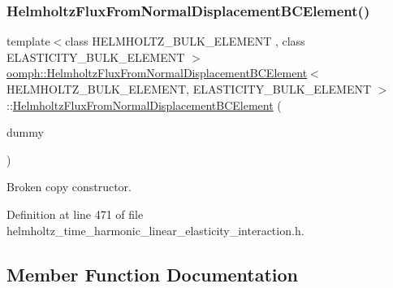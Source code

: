 \subsubsection{\texorpdfstring{Helmholtz\+Flux\+From\+Normal\+Displacement\+B\+C\+Element()}{HelmholtzFluxFromNormalDisplacementBCElement()}\hspace{0.1cm}{\footnotesize\ttfamily [2/2]}}
{\footnotesize\ttfamily template$<$class H\+E\+L\+M\+H\+O\+L\+T\+Z\+\_\+\+B\+U\+L\+K\+\_\+\+E\+L\+E\+M\+E\+NT , class E\+L\+A\+S\+T\+I\+C\+I\+T\+Y\+\_\+\+B\+U\+L\+K\+\_\+\+E\+L\+E\+M\+E\+NT $>$ \\
\hyperlink{classoomph_1_1HelmholtzFluxFromNormalDisplacementBCElement}{oomph\+::\+Helmholtz\+Flux\+From\+Normal\+Displacement\+B\+C\+Element}$<$ H\+E\+L\+M\+H\+O\+L\+T\+Z\+\_\+\+B\+U\+L\+K\+\_\+\+E\+L\+E\+M\+E\+NT, E\+L\+A\+S\+T\+I\+C\+I\+T\+Y\+\_\+\+B\+U\+L\+K\+\_\+\+E\+L\+E\+M\+E\+NT $>$\+::\hyperlink{classoomph_1_1HelmholtzFluxFromNormalDisplacementBCElement}{Helmholtz\+Flux\+From\+Normal\+Displacement\+B\+C\+Element} (\begin{DoxyParamCaption}\item[{const \hyperlink{classoomph_1_1HelmholtzFluxFromNormalDisplacementBCElement}{Helmholtz\+Flux\+From\+Normal\+Displacement\+B\+C\+Element}$<$ H\+E\+L\+M\+H\+O\+L\+T\+Z\+\_\+\+B\+U\+L\+K\+\_\+\+E\+L\+E\+M\+E\+NT, E\+L\+A\+S\+T\+I\+C\+I\+T\+Y\+\_\+\+B\+U\+L\+K\+\_\+\+E\+L\+E\+M\+E\+NT $>$ \&}]{dummy }\end{DoxyParamCaption})\hspace{0.3cm}{\ttfamily [inline]}}



Broken copy constructor. 



Definition at line 471 of file helmholtz\+\_\+time\+\_\+harmonic\+\_\+linear\+\_\+elasticity\+\_\+interaction.\+h.



\subsection{Member Function Documentation}
\mbox{\label{classoomph_1_1HelmholtzFluxFromNormalDisplacementBCElement_a5e10f6e632c05ce464548f51c8381b43}} 
